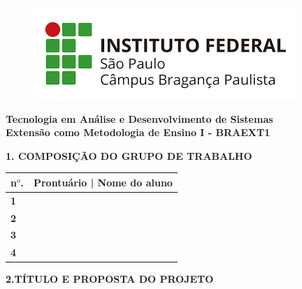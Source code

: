 \documentclass[
	hidelinks,
	12pt,				%
	openright,			%
	oneside,			%
	a4paper,			%
	english,			%
	french,				%
	spanish,			%
	brazil,				%
]{abntex2}
\newcommand{\imprimirautorA}{\oautorA}
\newcommand{\imprimirprontuarioA}{\oprontuarioA}
\newcommand{\imprimirautorB}{\oautorB}
\newcommand{\imprimirprontuarioB}{\oprontuarioB}
\newcommand{\imprimirautorC}{\oautorC}
\newcommand{\imprimirprontuarioC}{\oprontuarioC}
\newcommand{\imprimirautorD}{\oautorD}
\newcommand{\imprimirprontuarioD}{\oprontuarioD}
\newcommand{\prof}[1]{\def \prof {#1}}
\begin{document}
\textual

\begin{figure}
\includegraphics[scale=.35]{imagens/IFSP-BRA.png} 
\end{figure}

\centering
\footnotesize\textbf{Tecnologia em Análise e Desenvolvimento de Sistemas} \\	\footnotesize\textbf{Extensão como Metodologia de Ensino I - BRAEXT1} \\ 

\begin{center}
\vspace{1cm}
    \normalsize \textbf{\imprimirtitulo}
\end{center}

\begin{flushright}
    \prof
\end{flushright}

\begin{flushleft}
    \small \textbf{1. COMPOSIÇÃO DO GRUPO DE TRABALHO}
\end{flushleft}
\begin{center}
	\begin{tabular}{|m{0.5cm}|m{4cm}|m{10cm}|}
		\hline 
	    \textbf{n$^o$.} & \multicolumn{2}{c|}{\textbf{Prontuário | Nome do aluno}} \\
		\hline
		\textbf{1} & \textit{\imprimirprontuarioA} & \textit{\imprimirautorA}\\
		\hline
		\textbf{2} & \textit{\imprimirprontuarioB} & \textit{\imprimirautorB}\\
		\hline
		\textbf{3} & \textit{\imprimirprontuarioC} & \textit{\imprimirautorC}\\
		\hline
        \textbf{4} & \textit{\imprimirprontuarioD} & \textit{\imprimirautorD}\\
		\hline
	\end{tabular}
\end{center}

\begin{flushleft}
   \normalsize\textbf{2.TÍTULO E PROPOSTA DO PROJETO}
\end{flushleft}
\end{document}
